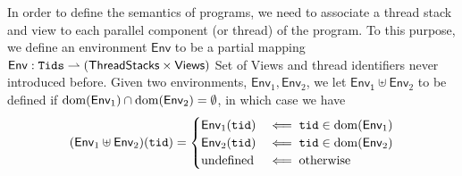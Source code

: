 \documentclass[a4paper,UKenglish]{article}%
\theoremstyle{plain}
\begin{document}
%
%
%

In order to define the semantics of programs, we need to associate 
a thread stack and view to each parallel component (or thread) of the program. 
To this purpose, we define an environment $\mathsf{Env}$ to be 
a partial mapping $\mathsf{Env} : \mathtt{Tids} \rightharpoonup (\mathsf{ThreadStacks} \times \mathsf{Views})$ 
\ac{Set of Views and thread identifiers never introduced before.} 
Given two environments, $\mathsf{Env}_1, \mathsf{Env}_2$, we let 
$\mathsf{Env_1} \uplus \mathsf{Env}_2$ to be defined if 
$\operatorname{dom}(\mathsf{Env}_1) \cap \operatorname{dom}(\mathsf{Env}_2) = \emptyset$, 
in which case we have 
\[
(\mathsf{Env}_1 \uplus \mathsf{Env}_2)(\mathtt{tid}) = \begin{cases}
\mathsf{Env}_1(\mathtt{tid}) & \impliedby \mathtt{tid} \in \operatorname{dom}(\mathsf{Env}_1)\\
\mathsf{Env}_2(\mathtt{tid}) & \impliedby \mathtt{tid} \in \operatorname{dom}(\mathsf{Env}_2)\\
\text{undefined} & \impliedby \text{otherwise}
\end{cases}
\]

\end{document}
